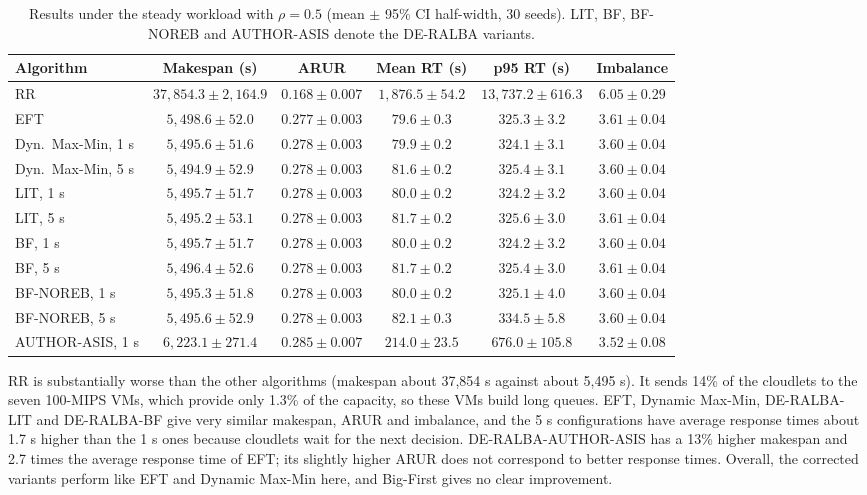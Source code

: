 \documentclass[default,sn-mathphys,Numbered]{sn-jnl}
\begin{document}
\begin{table}[h]
\caption{Results under the steady workload with $\rho = 0.5$ (mean $\pm$ 95\% CI half-width, 30 seeds). LIT, BF, BF-NOREB and AUTHOR-ASIS denote the DE-RALBA variants.}\label{tab:rho05}
\centering
\fontsize{6.6pt}{8pt}\selectfont
\setlength{\tabcolsep}{2pt}
\begin{tabular}{lccccc}
\toprule
Algorithm & Makespan (s) & ARUR & Mean RT (s) & p95 RT (s) & Imbalance \\
\midrule
RR & $37{,}854.3 \pm 2{,}164.9$ & $0.168 \pm 0.007$ & $1{,}876.5 \pm 54.2$ & $13{,}737.2 \pm 616.3$ & $6.05 \pm 0.29$ \\
EFT & $5{,}498.6 \pm 52.0$ & $0.277 \pm 0.003$ & $79.6 \pm 0.3$ & $325.3 \pm 3.2$ & $3.61 \pm 0.04$ \\
Dyn.\ Max-Min, 1 s & $5{,}495.6 \pm 51.6$ & $0.278 \pm 0.003$ & $79.9 \pm 0.2$ & $324.1 \pm 3.1$ & $3.60 \pm 0.04$ \\
Dyn.\ Max-Min, 5 s & $5{,}494.9 \pm 52.9$ & $0.278 \pm 0.003$ & $81.6 \pm 0.2$ & $325.4 \pm 3.1$ & $3.60 \pm 0.04$ \\
LIT, 1 s & $5{,}495.7 \pm 51.7$ & $0.278 \pm 0.003$ & $80.0 \pm 0.2$ & $324.2 \pm 3.2$ & $3.60 \pm 0.04$ \\
LIT, 5 s & $5{,}495.2 \pm 53.1$ & $0.278 \pm 0.003$ & $81.7 \pm 0.2$ & $325.6 \pm 3.0$ & $3.61 \pm 0.04$ \\
BF, 1 s & $5{,}495.7 \pm 51.7$ & $0.278 \pm 0.003$ & $80.0 \pm 0.2$ & $324.2 \pm 3.2$ & $3.60 \pm 0.04$ \\
BF, 5 s & $5{,}496.4 \pm 52.6$ & $0.278 \pm 0.003$ & $81.7 \pm 0.2$ & $325.4 \pm 3.0$ & $3.61 \pm 0.04$ \\
BF-NOREB, 1 s & $5{,}495.3 \pm 51.8$ & $0.278 \pm 0.003$ & $80.0 \pm 0.2$ & $325.1 \pm 4.0$ & $3.60 \pm 0.04$ \\
BF-NOREB, 5 s & $5{,}495.6 \pm 52.9$ & $0.278 \pm 0.003$ & $82.1 \pm 0.3$ & $334.5 \pm 5.8$ & $3.60 \pm 0.04$ \\
AUTHOR-ASIS, 1 s & $6{,}223.1 \pm 271.4$ & $0.285 \pm 0.007$ & $214.0 \pm 23.5$ & $676.0 \pm 105.8$ & $3.52 \pm 0.08$ \\
\bottomrule
\end{tabular}
\end{table}

RR is substantially worse than the other algorithms (makespan about 37,854 s against about 5,495 s). It sends 14\% of the cloudlets to the seven 100-MIPS VMs, which provide only 1.3\% of the capacity, so these VMs build long queues. EFT, Dynamic Max-Min, DE-RALBA-LIT and DE-RALBA-BF give very similar makespan, ARUR and imbalance, and the 5 s configurations have average response times about 1.7 s higher than the 1 s ones because cloudlets wait for the next decision. DE-RALBA-AUTHOR-ASIS has a 13\% higher makespan and 2.7 times the average response time of EFT; its slightly higher ARUR does not correspond to better response times. Overall, the corrected variants perform like EFT and Dynamic Max-Min here, and Big-First gives no clear improvement.
\end{document}
